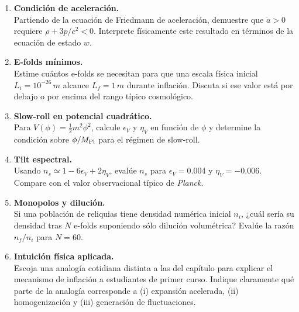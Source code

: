 \begin{enumerate}[leftmargin=2.2em, label=\textbf{P\arabic*.}]

\item \textbf{Condición de aceleración.} \\
Partiendo de la ecuación de Friedmann de aceleración, demuestre que $\ddot a>0$ requiere $\rho+3p/c^2<0$. Interprete físicamente este resultado en términos de la ecuación de estado $w$.

\item \textbf{E-folds mínimos.} \\
Estime cuántos e-folds se necesitan para que una escala física inicial $L_i=10^{-26}\,\si{m}$ alcance $L_f=1\,\si{m}$ durante inflación. Discuta si ese valor está por debajo o por encima del rango típico cosmológico.

\item \textbf{Slow-roll en potencial cuadrático.} \\
Para $V(\phi)=\frac{1}{2}m^2\phi^2$, calcule $\epsilon_V$ y $\eta_V$ en función de $\phi$ y determine la condición sobre $\phi/M_{\rm Pl}$ para el régimen de slow-roll.

\item \textbf{Tilt espectral.} \\
Usando $n_s \simeq 1-6\epsilon_V+2\eta_V$, evalúe $n_s$ para $\epsilon_V=0.004$ y $\eta_V=-0.006$. Compare con el valor observacional típico de \textit{Planck}.

\item \textbf{Monopolos y dilución.} \\
Si una población de reliquias tiene densidad numérica inicial $n_i$, ¿cuál sería su densidad tras $N$ e-folds suponiendo sólo dilución volumétrica? Evalúe la razón $n_f/n_i$ para $N=60$.

\item \textbf{Intuición física aplicada.} \\
Escoja una analogía cotidiana distinta a las del capítulo para explicar el mecanismo de inflación a estudiantes de primer curso. Indique claramente qué parte de la analogía corresponde a (i) expansión acelerada, (ii) homogenización y (iii) generación de fluctuaciones.

\end{enumerate}
